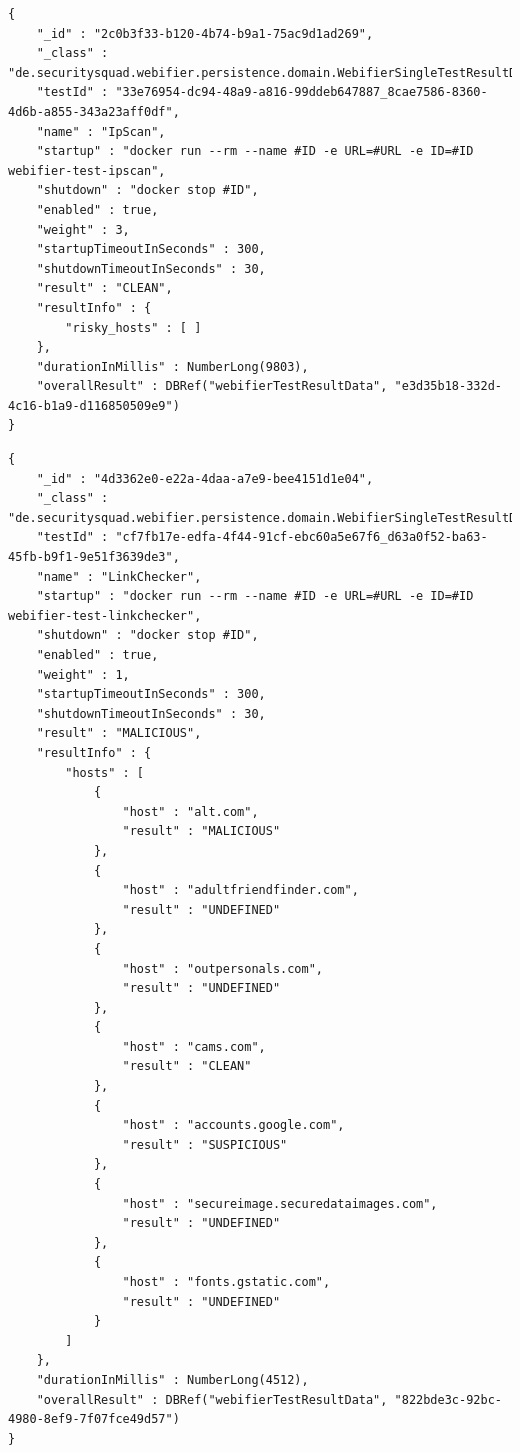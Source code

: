 \begin{scriptsize}
\begin{lstlisting}
{
    "_id" : "2c0b3f33-b120-4b74-b9a1-75ac9d1ad269",
    "_class" : "de.securitysquad.webifier.persistence.domain.WebifierSingleTestResultData",
    "testId" : "33e76954-dc94-48a9-a816-99ddeb647887_8cae7586-8360-4d6b-a855-343a23aff0df",
    "name" : "IpScan",
    "startup" : "docker run --rm --name #ID -e URL=#URL -e ID=#ID webifier-test-ipscan",
    "shutdown" : "docker stop #ID",
    "enabled" : true,
    "weight" : 3,
    "startupTimeoutInSeconds" : 300,
    "shutdownTimeoutInSeconds" : 30,
    "result" : "CLEAN",
    "resultInfo" : {
        "risky_hosts" : [ ]
    },
    "durationInMillis" : NumberLong(9803),
    "overallResult" : DBRef("webifierTestResultData", "e3d35b18-332d-4c16-b1a9-d116850509e9")
}

\end{lstlisting}
\end{scriptsize}

\newpage

\begin{scriptsize}
\begin{lstlisting}
{
    "_id" : "4d3362e0-e22a-4daa-a7e9-bee4151d1e04",
    "_class" : "de.securitysquad.webifier.persistence.domain.WebifierSingleTestResultData",
    "testId" : "cf7fb17e-edfa-4f44-91cf-ebc60a5e67f6_d63a0f52-ba63-45fb-b9f1-9e51f3639de3",
    "name" : "LinkChecker",
    "startup" : "docker run --rm --name #ID -e URL=#URL -e ID=#ID webifier-test-linkchecker",
    "shutdown" : "docker stop #ID",
    "enabled" : true,
    "weight" : 1,
    "startupTimeoutInSeconds" : 300,
    "shutdownTimeoutInSeconds" : 30,
    "result" : "MALICIOUS",
    "resultInfo" : {
        "hosts" : [
            {
                "host" : "alt.com",
                "result" : "MALICIOUS"
            },
            {
                "host" : "adultfriendfinder.com",
                "result" : "UNDEFINED"
            },
            {
                "host" : "outpersonals.com",
                "result" : "UNDEFINED"
            },
            {
                "host" : "cams.com",
                "result" : "CLEAN"
            },
            {
                "host" : "accounts.google.com",
                "result" : "SUSPICIOUS"
            },
            {
                "host" : "secureimage.securedataimages.com",
                "result" : "UNDEFINED"
            },
            {
                "host" : "fonts.gstatic.com",
                "result" : "UNDEFINED"
            }
        ]
    },
    "durationInMillis" : NumberLong(4512),
    "overallResult" : DBRef("webifierTestResultData", "822bde3c-92bc-4980-8ef9-7f07fce49d57")
}
\end{lstlisting}
\end{scriptsize}

